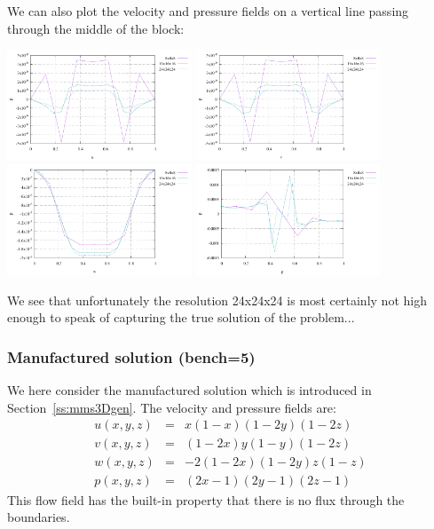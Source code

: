 We can also plot the velocity and pressure fields on a vertical line passing 
through the middle of the block:
\begin{center}
\includegraphics[width=5.5cm]{python_codes/fieldstone_82/results/bench4/vert_u}
\includegraphics[width=5.5cm]{python_codes/fieldstone_82/results/bench4/vert_v}
\includegraphics[width=5.5cm]{python_codes/fieldstone_82/results/bench4/vert_w}
\includegraphics[width=5.5cm]{python_codes/fieldstone_82/results/bench4/vert_p}
\end{center}
We see that unfortunately the resolution 24x24x24 is most certainly not high 
enough to speak of capturing the true solution of the problem...




\subsubsection*{Manufactured solution (bench=5)}

We here consider the manufactured solution which is introduced in Section~\ref{ss:mms3Dgen}.
The velocity and pressure fields are:
\begin{eqnarray}
u(x,y,z) &=& x(1-x)(1-2y)(1-2z)\\
v(x,y,z) &=& (1-2x) y(1-y) (1-2z) \\
w(x,y,z) &=& -2(1-2x)(1-2y)z(1-z) \\
p(x,y,z) &=& (2x-1)(2y-1)(2z-1)
\end{eqnarray}
This flow field has the built-in property that there is no flux through the 
boundaries.

